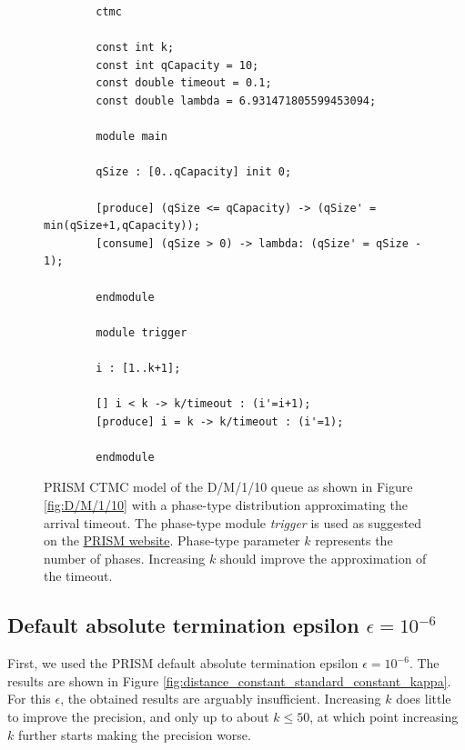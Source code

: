 \documentclass[paper=a4, fontsize=11pt]{scrartcl}
\numberwithin{equation}{section}		%
\numberwithin{figure}{section}			%
\numberwithin{table}{section}				%
\begin{document}
	\begin{figure}[H]
		\begin{lstlisting}
		ctmc
		
		const int k;
		const int qCapacity = 10;
		const double timeout = 0.1;
		const double lambda = 6.931471805599453094;
		
		module main
		
		qSize : [0..qCapacity] init 0;
		
		[produce] (qSize <= qCapacity) -> (qSize' = min(qSize+1,qCapacity));
		[consume] (qSize > 0) -> lambda: (qSize' = qSize - 1);
		
		endmodule
		
		module trigger
		
		i : [1..k+1];
		
		[] i < k -> k/timeout : (i'=i+1);
		[produce] i = k -> k/timeout : (i'=1);
		
		endmodule
		\end{lstlisting}
		\caption{PRISM CTMC model of the D/M/1/10 queue as shown in Figure \ref{fig:D/M/1/10} with a phase-type distribution approximating the arrival timeout. The phase-type module \emph{trigger} is used as suggested on the \href{http://www.prismmodelchecker.org/manual/FrequentlyAskedQuestions/PRISMModelling}{PRISM website}. Phase-type parameter $k$ represents the number of phases. Increasing $k$ should improve the approximation of the timeout. }
		\label{fig:D/M/1/10_PRISM}
	\end{figure}
	
	\subsection{Default absolute termination epsilon $\epsilon = 10^{-6}$}
	\label{S:2.1}
	
	First, we used the PRISM default absolute termination epsilon $\epsilon = 10^{-6}$. The results are shown in Figure \ref{fig:distance_constant_standard_constant_kappa}. For this $\epsilon$, the obtained results are arguably insufficient. Increasing $k$ does little to improve the precision, and only up to about $k \leq 50$, at which point increasing $k$ further starts making the precision worse.
	
\end{document}
